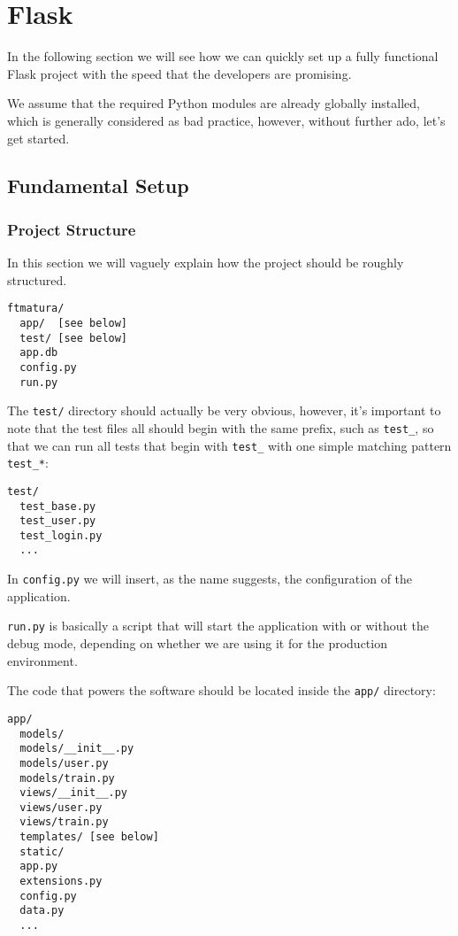 \documentclass[../main/main.tex]{subfiles}
\begin{document}
\section{Flask}  

In the following section we will see how we can quickly set up a fully
functional Flask project with the speed that the developers are
promising.

We assume that the required Python modules are already globally
installed, which is generally considered as bad practice, however,
without further ado, let's get started.

\subsection{Fundamental Setup}

\subsubsection{Project Structure}

In this section we will vaguely explain how the project should be
roughly structured.

\begin{lstlisting}
ftmatura/
  app/  [see below]
  test/ [see below]
  app.db
  config.py
  run.py
\end{lstlisting}

The \lstinline|test/| directory should actually be very obvious,
however, it's important to note that the test files all should begin
with the same prefix, such as \lstinline|test_|, so that we can run
all tests that begin with \lstinline|test_| with one simple matching
pattern \lstinline|test_*|: 

\begin{lstlisting}
test/
  test_base.py
  test_user.py
  test_login.py
  ...
\end{lstlisting}

In \lstinline|config.py| we will insert, as the name suggests, the
configuration of the application. 

\lstinline|run.py| is basically a script that will start the
application with or without the debug mode, depending on whether we are using
it for the production environment. 

The code that powers the software should be located inside the \lstinline|app/|
directory:

\begin{lstlisting}
app/
  models/
  models/__init__.py
  models/user.py
  models/train.py
  views/__init__.py
  views/user.py
  views/train.py
  templates/ [see below]
  static/ 
  app.py
  extensions.py
  config.py
  data.py
  ...
\end{lstlisting}
\end{document}
